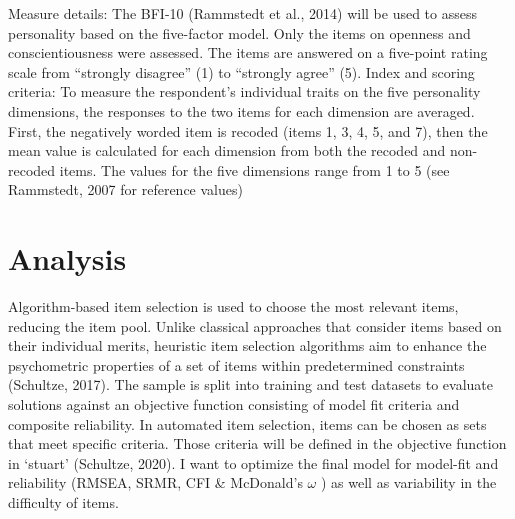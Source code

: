 \documentclass[
  12pt,
  a4paper,
  twoside]{article}
\begin{document}
Measure details: The BFI-10 (Rammstedt et al., 2014) will be used to assess
personality based on the five-factor model. Only the items on openness and
conscientiousness were assessed.
The items are answered on a five-point rating scale from ``strongly disagree'' (1) to
``strongly agree'' (5).
Index and scoring criteria: To measure the respondent's individual traits on the five
personality dimensions, the responses to the two items for each dimension are
averaged. First, the negatively worded item is recoded (items 1, 3, 4, 5, and 7), then
the mean value is calculated for each dimension from both the recoded and non-
recoded items. The values for the five dimensions range from 1 to 5 (see
Rammstedt, 2007 for reference values)

\section{Analysis}\label{analysis}

Algorithm-based item selection is used to choose the most relevant items, reducing the item pool. Unlike classical approaches that consider items based on their individual merits, heuristic item selection algorithms aim to enhance the psychometric properties of a set of items within predetermined constraints (Schultze, 2017). The sample is split into training and test datasets to evaluate solutions against an objective function consisting of model fit criteria and composite reliability. In automated item selection, items can be chosen as sets that meet specific criteria. Those criteria will be defined in the objective function in `stuart' (Schultze, 2020). I want to optimize the final model for model-fit and reliability (RMSEA, SRMR, CFI \& McDonald's \(\omega\) ) as well as variability in the difficulty of items.
\end{document}
